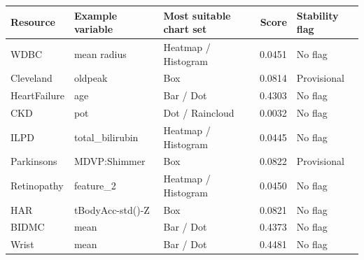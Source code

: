 \begin{tabular}{p{2.4cm}p{3.0cm}p{3.8cm}rp{2.2cm}}\toprule Resource & Example variable & Most suitable chart set & Score & Stability flag\\\midrule
WDBC\cite{wdbc} & mean radius & Heatmap / Histogram & 0.0451 & No flag\\
Cleveland\cite{heart} & oldpeak & Box & 0.0814 & Provisional\\
HeartFailure\cite{failure} & age & Bar / Dot & 0.4303 & No flag\\
CKD\cite{kidney} & pot & Dot / Raincloud & 0.0032 & No flag\\
ILPD\cite{liver} & total\_bilirubin & Heatmap / Histogram & 0.0445 & No flag\\
Parkinsons\cite{parkinsons} & MDVP:Shimmer & Box & 0.0822 & Provisional\\
Retinopathy\cite{retina} & feature\_2 & Heatmap / Histogram & 0.0450 & No flag\\
HAR\cite{har} & tBodyAcc-std()-Z & Box & 0.0821 & No flag\\
BIDMC\cite{bidmc} & mean & Bar / Dot & 0.4373 & No flag\\
Wrist\cite{wrist} & mean & Bar / Dot & 0.4481 & No flag\\
\bottomrule\end{tabular}